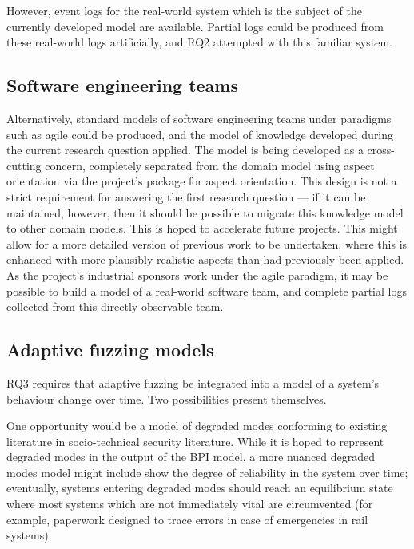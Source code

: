 \documentclass[11pt]{article}
\begin{document}
However, event logs for the real-world system which is the subject of the
currently developed model are available\cite{van3536bpi}. Partial logs could be
produced from these real-world logs artificially, and RQ2 attempted with this
familiar system.

\subsection{Software engineering teams}
\label{sec:orgad6f288}

Alternatively, standard models of software engineering teams under paradigms
such as agile\cite{reference_agile_model} could be produced, and the model of
knowledge\cite{hanakawa} developed during the current research question applied. The model is
being developed as a cross-cutting concern, completely separated from the domain
model using aspect orientation via the project's package for aspect
orientation\cite{asp_repo}. This design is not a strict requirement for
answering the first research question --- if it can be maintained, however, then
it should be possible to migrate this knowledge model to other domain models.
This is hoped to accelerate future projects. This might allow for a more
detailed version of previous work\cite{pdsf_paper} to be undertaken, where
this is enhanced with more plausibly realistic aspects than had previously been
applied. As the project's industrial sponsors work under the agile paradigm, it
may be possible to build a model of a real-world software team, and complete
partial logs collected from this directly observable team.


\subsection{Adaptive fuzzing models}
\label{sec:orgaa7fd5c}

RQ3 requires that adaptive fuzzing be integrated into a model of a system's
behaviour change over time. Two possibilities present themselves.

One opportunity would be a model of degraded modes conforming to existing
literature in socio-technical security literature. While it is hoped to
represent degraded modes in the output of the BPI model, a more nuanced degraded
modes model might include show the degree of reliability in the system over
time; eventually, systems entering degraded modes should reach an equilibrium
state where most systems which are not immediately vital are circumvented (for
example, paperwork designed to trace errors in case of emergencies in rail
systems).
\end{document}
